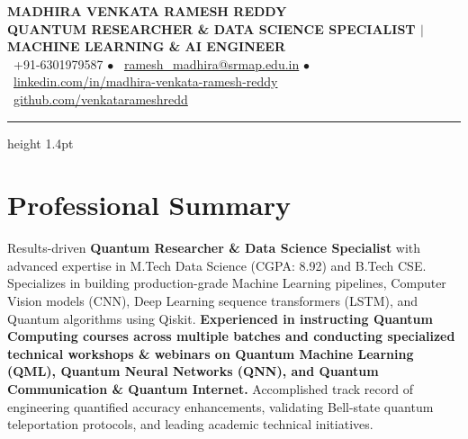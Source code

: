 \documentclass[10pt,letterpaper]{article}
\begin{document}
\begin{center}
    {\LARGE \bfseries \color{primaryNavy} MADHIRA VENKATA RAMESH REDDY} \\[2pt]
    {\footnotesize \bfseries \color{accentBlue} QUANTUM RESEARCHER \& DATA SCIENCE SPECIALIST $|$ MACHINE LEARNING \& AI ENGINEER} \\[3pt]
    {\footnotesize \color{bodyDark}
        \color{accentBlue}\faPhone* \ \color{bodyDark}+91-6301979587 \quad $\bullet$ \quad
        \color{accentBlue}\faEnvelope \ \href{mailto:ramesh_madhira@srmap.edu.in}{\color{bodyDark}ramesh\_madhira@srmap.edu.in} \quad $\bullet$ \quad
        \color{accentBlue}\faLinkedin \ \href{https://linkedin.com/in/madhira-venkata-ramesh-reddy}{\color{bodyDark}linkedin.com/in/madhira-venkata-ramesh-reddy}
    } \\[1.5pt]
    {\footnotesize \color{bodyDark}
        \color{accentBlue}\faGithub \ \href{https://github.com/venkatarameshredd}{\color{bodyDark}github.com/venkatarameshredd}
    }
\end{center}
\vspace{-6pt}
{\color{primaryNavy}\hrule height 1.4pt}
\vspace{2pt}

\section{Professional Summary}
{\footnotesize \color{bodyDark}
Results-driven \textbf{\color{primaryNavy}Quantum Researcher \& Data Science Specialist} with advanced expertise in M.Tech Data Science (CGPA: 8.92) and B.Tech CSE. Specializes in building production-grade Machine Learning pipelines, Computer Vision models (CNN), Deep Learning sequence transformers (LSTM), and Quantum algorithms using Qiskit. \textbf{\color{primaryNavy}Experienced in instructing Quantum Computing courses across multiple batches and conducting specialized technical workshops \& webinars on Quantum Machine Learning (QML), Quantum Neural Networks (QNN), and Quantum Communication \& Quantum Internet.} Accomplished track record of engineering quantified accuracy enhancements, validating Bell-state quantum teleportation protocols, and leading academic technical initiatives.
}
\vspace{-2pt}
\end{document}
